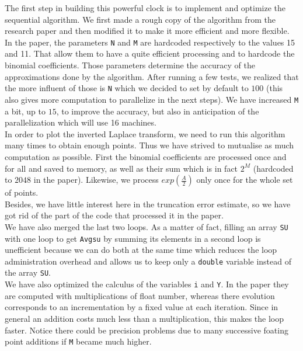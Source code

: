 \documentclass[11pt,a4paper]{article}
\begin{document}
The first step in building this powerful clock is to implement and optimize the sequential algorithm. We first made a rough copy of the algorithm from the research paper and then modified it to make it more efficient and more flexible.\\

In the paper, the parameters \verb_N_ and \verb_M_ are hardcoded respectively to the values 15 and 11. That allow them to have a quite efficient processing and to hardcode the binomial coefficients. Those parameters determine the accuracy of the approximations done by the algorithm. After running a few tests, we realized that the more influent of those is \verb_N_ which we decided to set by default to $100$ (this also gives more computation to parallelize in the next steps). We have increased \verb_M_ a bit, up to $15$, to improve the accuracy, but also in anticipation of the parallelization which will use 16 machines.\\

In order to plot the inverted Laplace transform, we need to run this algorithm many times to obtain enough points. Thus we have strived to mutualise as much computation as possible. First the binomial coefficients are processed once and for all and saved to memory, as well as their sum which is in fact $2^M$ (hardcoded to $2048$ in the paper). Likewise, we process $exp(\frac{A}{2})$ only once for the whole set of points.\\

Besides, we have little interest here in the truncation error estimate, so we have got rid of the part of the code that processed it in the paper.\\

We have also merged the last two loops. As a matter of fact, filling an array \verb_SU_ with one loop to get \verb_Avgsu_ by summing its elements in a second loop is unefficient because we can do both at the same time which reduces the loop administration overhead and allows us to keep only a \verb_double_ variable instead of the array \verb_SU_.\\

We have also optimized the calculus of the variables \verb_i_ and \verb_Y_. In the paper they are computed with multiplications of float number, whereas there evolution corresponds to an incrementation by a fixed value at each iteration. Since in general an addition costs much less than a multiplication, this makes the loop faster. Notice there could be precision problems due to many successive foating point additions if \verb_M_ became much higher.\\
\end{document}

